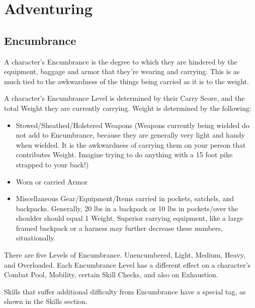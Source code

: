\documentclass[oneside,11pt,english]{book}
\begin{document}
\chapter{Adventuring}\label{ch:adventuring} %
\startcontents[chapters]
\clearpage

\section{Encumbrance}\label{sec:Encumbrance}
A character’s Encumbrance is the degree to which they are hindered by the equipment, baggage and 
armor that they’re wearing and carrying. This is as much tied to the awkwardness of the things being carried as it is to the weight.

A character’s Encumbrance Level is determined by their Carry Score, and the total Weight they are 
currently carrying. Weight is determined by the following:
	\begin{itemize}
		\item Stowed/Sheathed/Holstered Weapons (Weapons currently being wielded do not add to Encumbrance, because they are generally very light and handy when wielded. It is the awkwardness of carrying them on your person that contributes Weight. Imagine trying to do anything with a 15 foot pike strapped to your back!)
		\item Worn or carried Armor
		\item Miscellaneous Gear/Equipment/Items carried in pockets, satchels, and backpacks. Generally, 20 lbs in a backpack or 10 lbs in pockets/over the shoulder should equal 1 Weight. Superior carrying equipment, like a large framed backpack or a harness may further decrease these numbers, situationally.
	\end{itemize}
There are five Levels of Encumbrance. Unencumbered, Light, Medium, Heavy, and Overloaded. 
Each Encumbrance Level has a different effect on a character’s Combat Pool, Mobility, certain Skill Checks, and also on Exhaustion.

Skills that suffer additional difficulty from Encumbrance have a special tag, as shown in the Skills section.
\end{document}
